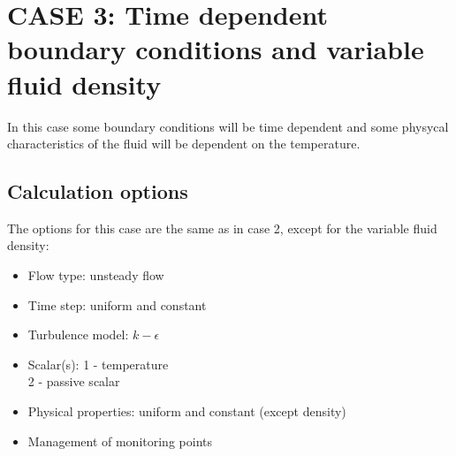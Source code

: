 %
% 
%
% 
% 
% 
%
\newpage
\section{CASE 3:  Time dependent boundary conditions and variable fluid density}
In this case some boundary conditions will be time dependent and some physycal
characteristics of the fluid will be dependent on the temperature.

	\subsection{Calculation options}

The options for this case are the same as in case 2, except for the variable fluid density:
\begin{itemize}
\renewcommand{\labelitemi}{$\rightarrow$}
	\item Flow type: unsteady flow
	\item Time step: uniform and constant
	\item Turbulence model: $k-\epsilon$
	\item Scalar(s): 1 - temperature\\
      \hspace*{1.6cm} 2 - passive scalar
	\item Physical properties: uniform and constant (except density)
	\item Management of monitoring points
\end{itemize}


